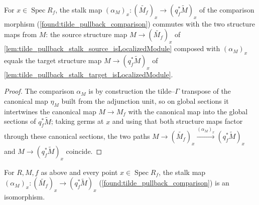 
\begin{lemma}
  \label{lem:tilde_pullback_stalk_comparison_commutes}
  For \(x\in\operatorname{Spec}R_f\), the stalk map \((\alpha_M)_x:(\widetilde{M_f})_x\to
  (q_f^{*}\widetilde M)_x\) of the comparison morphism
  (\cref{found:tilde_pullback_comparison}) commutes with the two structure maps from \(M\):
  the source structure map \(M\to(\widetilde{M_f})_x\) of
  \cref{lem:tilde_pullback_stalk_source_isLocalizedModule} composed with \((\alpha_M)_x\)
  equals the target structure map \(M\to(q_f^{*}\widetilde M)_x\) of
  \cref{lem:tilde_pullback_stalk_target_isLocalizedModule}.
\end{lemma}

\begin{proof}
  The comparison \(\alpha_M\) is by construction the tilde--\(\Gamma\) transpose of the
  canonical map \(\eta_M\) built from the adjunction unit, so on global sections it
  intertwines the canonical map \(M\to M_f\) with the canonical map into the global
  sections of \(q_f^{*}\widetilde M\); taking germs at \(x\) and using that both structure
  maps factor through these canonical sections, the two paths \(M\to(\widetilde{M_f})_x
  \xrightarrow{(\alpha_M)_x}(q_f^{*}\widetilde M)_x\) and \(M\to(q_f^{*}\widetilde M)_x\)
  coincide.
\end{proof}

\begin{lemma}
  \label{found:tilde_pullback_comparison_stalk}
  For \(R,M,f\) as above and every point \(x\in\operatorname{Spec}R_f\), the stalk map
  \((\alpha_M)_x:(\widetilde{M_f})_x\to(q_f^{*}\widetilde M)_x\)
  (\cref{found:tilde_pullback_comparison}) is an isomorphism.
\end{lemma}

